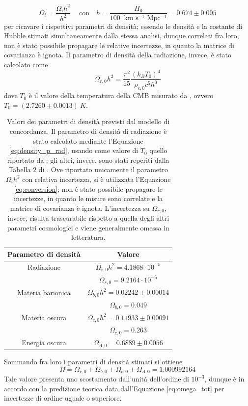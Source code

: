\begin{equation}
  \Omega_i= \frac{\Omega_i h^2}{h^2}\ \quad \text{con} \quad h=\frac{H_0}{100\ \text{ km s$^{-1}$ Mpc$^{-1}$} }= 0.674 \pm 0.005
  \label{eq:conversion}
\end{equation}
per ricavare i rispettivi parametri di densità; essendo le densità e la costante di Hubble stimati simultaneamente dalla stessa analisi, dunque correlati fra loro, non è stato possibile propagare le relative incertezze, in quanto la matrice di covarianza è ignota.
Il parametro di densità della radiazione, invece, è stato calcolato come
\begin{equation}
    \Omega_{r,0 }h^2 = \frac{\pi^2}{15} \frac{(k_B T_0)^4}{\rho_{c,0} c^5 \hbar^3}
    \label{eq:density_p_rad}
\end{equation}
dove $T_0$ è il valore della temperatura della CMB misurato da \textcite{Fixsen2009}, ovvero $T_0=(2.7260 \pm 0.0013)\ K$.
\begin{table}[]
    \centering
    \begin{tabular}{|c|c|}
    \hline
      \textbf{Parametro di densità} & \textbf{Valore}\\
      \hline
      Radiazione   & $\Omega_{r,0}h^2=4.1868 \cdot 10^{-5}$\\
      & $\Omega_{r,0}=9.2164 \cdot 10^{-5}$ \\
      \hline
      Materia barionica   & $\Omega_{b,0}h^2=0.02242 \pm 0.00014 $\\
      & $\Omega_{b,0}=0.049$ \\
    \hline
    Materia oscura & $\Omega_{c,0}h^2=0.11933 \pm 0.00091$ \\
     & $\Omega_{c,0}=0.263$ \\
     \hline
     Energia oscura & $\Omega_{\Lambda,0}=0.6889 \pm 0.0056$ \\
     \hline
    \end{tabular}
    \caption{Valori dei parametri di densità previsti dal modello di concordanza. Il parametro di densità di radiazione è stato calcolato mediante l'Equazione \ref{eq:density_p_rad}, usando come valore di $T_0$ quello riportato da \textcite{Fixsen2009}; gli altri, invece, sono stati reperiti dalla Tabella 2 di \textcite{Planck2018}. Ove riportato unicamente il parametro $\Omega_i h^2$ con relativa incertezza, si è utilizzata l'Equazione \ref{eq:conversion}; non è stato possibile propagare le incertezze, in quanto le misure sono correlate e la matrice di covarianza è ignota. L'incertezza su $\Omega_{r,0}$, invece, risulta trascurabile rispetto a quella degli altri parametri cosmologici e viene generalmente omessa in letteratura. }
    \label{tab:density_parameters_LCDM}
\end{table}
Sommando fra loro i parametri di densità stimati si ottiene
\begin{equation}
    \Omega=\Omega_{r,0}+\Omega_{b,0}+\Omega_{c,0}+\Omega_{\Lambda,0}=1.000992164
    \label{eq:density_parameter_tot}
\end{equation}
Tale valore presenta uno scostamento dall'unità dell'ordine di $10^{-3}$, dunque è in accordo con la predizione teorica data dall'Equazione \ref{eq:omega_tot} per incertezze di ordine uguale o superiore.

